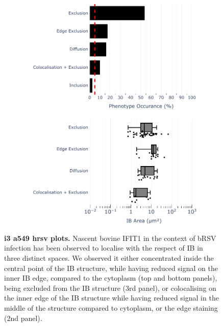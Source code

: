 \begin{figure}
    \begin{subfigure}{0.5\textwidth}
        \caption{}
        \includegraphics[width=1\linewidth]{09. Chapter 4/Figs/02. Infection/02. IFIT3/01. bar_i3_a549.pdf} 
    \end{subfigure}
    \begin{subfigure}{0.5\textwidth}
        \caption{}
        \includegraphics[width=1\linewidth]{09. Chapter 4/Figs/02. Infection/02. IFIT3/02. box_i3_a549.pdf}
    \end{subfigure}
    \caption[i3 a549 hrsv plots]{\textbf{i3 a549 hrsv plots.} Nascent bovine IFIT1 in the context of bRSV infection has been observed to localise with the respect of IB in three distinct spaces. We observed it either concentrated inside the central point of the IB structure, while having reduced signal on the inner IB edge, compared to the cytoplasm (top and bottom panels), being excluded from the IB structure (3rd panel), or colocalising on the inner edge of the IB structure while having reduced signal in the middle of the structure compared to cytoplasm, or the edge staining (2nd panel).}
    \label{fig:i3 a549 hrsv plots}
\end{figure}

